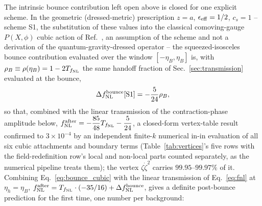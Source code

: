 \documentclass[aps,prd,twocolumn,superscriptaddress,nofootinbib,longbibliography]{revtex4-2}
\newcommand{\fnl}{f_{\rm NL}}
\begin{document}
The intrinsic bounce contribution left open above is closed for one explicit
scheme. In the geometric (dressed-metric) prescription $z=a$,
$\epsilon_{\rm eff}=1/2$, $c_s=1$ -- scheme S1, the substitution of these
values into the classical comoving-gauge $P(X,\phi)$ cubic action of
Ref.~\cite{Maldacena2002}, an assumption of the scheme and not a derivation
of the quantum-gravity-dressed operator -- the squeezed-isosceles bounce
contribution evaluated over the window $[-\eta_B,\eta_B]$ is, with
$\rho_B\equiv\rho(\eta_B)=1-2T_{\fnl}$ the same handoff fraction of
Sec.~\ref{sec:transmission} evaluated at the bounce,
\begin{equation}
  \Delta\fnl^{\rm bounce}[{\rm S1}] = -\frac{5}{24}\rho_B,
  \label{eq:bounce_cubic}
\end{equation}
so that, combined with the linear transmission of the contraction-phase
amplitude below, $\fnl^{\rm after}=-\dfrac{85}{48}T_{\fnl}-\dfrac{5}{24}$,
a closed-form vertex-table result confirmed to $3\times10^{-4}$ by an
independent finite-$k$ numerical in-in evaluation of all six cubic
attachments and boundary terms (Table~\ref{tab:vertices}'s five rows with
the field-redefinition row's local and non-local parts counted separately,
as the numerical pipeline treats them); the vertex $\zeta\dot\zeta^2$ carries
$99.95$--$99.97\%$ of it. Combining Eq.~\eqref{eq:bounce_cubic} with the
linear transmission of Eq.~\eqref{eq:fnl} at $\eta_h=\eta_B$,
$\fnl^{\rm after}=T_{\fnl}\cdot(-35/16)+\Delta\fnl^{\rm bounce}$, gives a
definite post-bounce prediction for the first time, one number per background:
\end{document}

